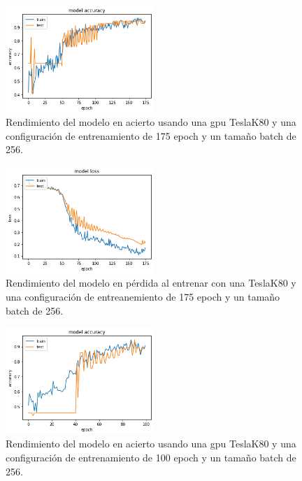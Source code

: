 \begin{figure}
    \centering
    \includegraphics[width=0.5\textwidth]{images/chapter5/batch_256_175_epoch.png}
    \caption{Rendimiento del modelo en acierto usando una gpu TeslaK80 y una configuración de entrenamiento de 175 epoch y un tamaño batch de 256.}
    \label{fig:Resultados de la precisión de entrenamiento con un batch-size de 256 y 175 epochs}
\end{figure}

\begin{figure}
    \centering
    \includegraphics[width=0.5\textwidth]{images/chapter5/batch_256_175_epoch_loss.png}
    \caption{Rendimiento del modelo en pérdida al entrenar con una TeslaK80 y una configuración de entreanemiento de 175 epoch y un tamaño batch de 256.}
    \label{fig:Resultados de loss en el entrenamiento con un batch-size de 256 y 175 epochs}
\end{figure}

\begin{figure}
    \centering
    \includegraphics[width=0.5\textwidth]{images/chapter5/batch_256_100_epoch.png}
    \caption{Rendimiento del modelo en acierto usando una gpu TeslaK80 y una configuración de entrenamiento de 100 epoch y un tamaño batch de 256.}
    \label{fig:Resultados de la precisión de entrenamiento con un batch-size de 256 y 100 epochs}
\end{figure}

